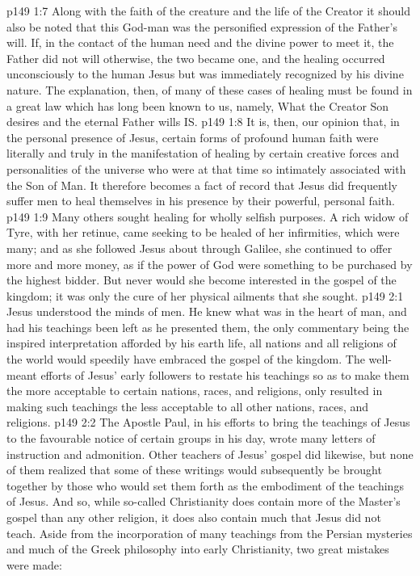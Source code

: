 \vs p149 1:7 \bibnobreakspace Along with the faith of the creature and the life of the Creator it should also be noted that this God\hyp{}man was the personified expression of the Father’s will. If, in the contact of the human need and the divine power to meet it, the Father did not will otherwise, the two became one, and the healing occurred unconsciously to the human Jesus but was immediately recognized by his divine nature. The explanation, then, of many of these cases of healing must be found in a great law which has long been known to us, namely, What the Creator Son desires and the eternal Father wills IS.
\vs p149 1:8 \pc It is, then, our opinion that, in the personal presence of Jesus, certain forms of profound human faith were literally and truly  in the manifestation of healing by certain creative forces and personalities of the universe who were at that time so intimately associated with the Son of Man. It therefore becomes a fact of record that Jesus did frequently suffer men to heal themselves in his presence by their powerful, personal faith.
\vs p149 1:9 Many others sought healing for wholly selfish purposes. A rich widow of Tyre, with her retinue, came seeking to be healed of her infirmities, which were many; and as she followed Jesus about through Galilee, she continued to offer more and more money, as if the power of God were something to be purchased by the highest bidder. But never would she become interested in the gospel of the kingdom; it was only the cure of her physical ailments that she sought.
\vs p149 2:1 Jesus understood the minds of men. He knew what was in the heart of man, and had his teachings been left as he presented them, the only commentary being the inspired interpretation afforded by his earth life, all nations and all religions of the world would speedily have embraced the gospel of the kingdom. The well\hyp{}meant efforts of Jesus’ early followers to restate his teachings so as to make them the more acceptable to certain nations, races, and religions, only resulted in making such teachings the less acceptable to all other nations, races, and religions.
\vs p149 2:2 The Apostle Paul, in his efforts to bring the teachings of Jesus to the favourable notice of certain groups in his day, wrote many letters of instruction and admonition. Other teachers of Jesus’ gospel did likewise, but none of them realized that some of these writings would subsequently be brought together by those who would set them forth as the embodiment of the teachings of Jesus. And so, while so\hyp{}called Christianity does contain more of the Master’s gospel than any other religion, it does also contain much that Jesus did not teach. Aside from the incorporation of many teachings from the Persian mysteries and much of the Greek philosophy into early Christianity, two great mistakes were made:
